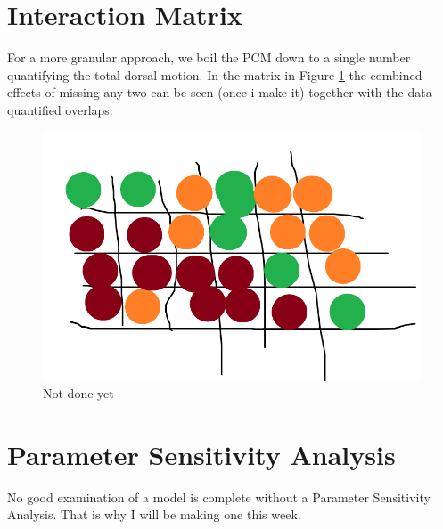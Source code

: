 \section{Interaction Matrix}
For a more granular approach, we boil the PCM down to a single number quantifying the total dorsal motion. In the matrix in Figure \ref{fig:PCM-matrix} the combined effects of missing any two can be seen (once i make it) together with the data-quantified overlaps:
\begin{figure}[H]
    \centering
    \includegraphics[width=1.\linewidth]{chapters/Results/figures/placeholder_domain_matrix.png}
    \caption{Not done yet}
    \label{fig:PCM-matrix}
\end{figure}


\section{Parameter Sensitivity Analysis}
No good examination of a model is complete without a Parameter Sensitivity Analysis. That is why I will be making one this week.




